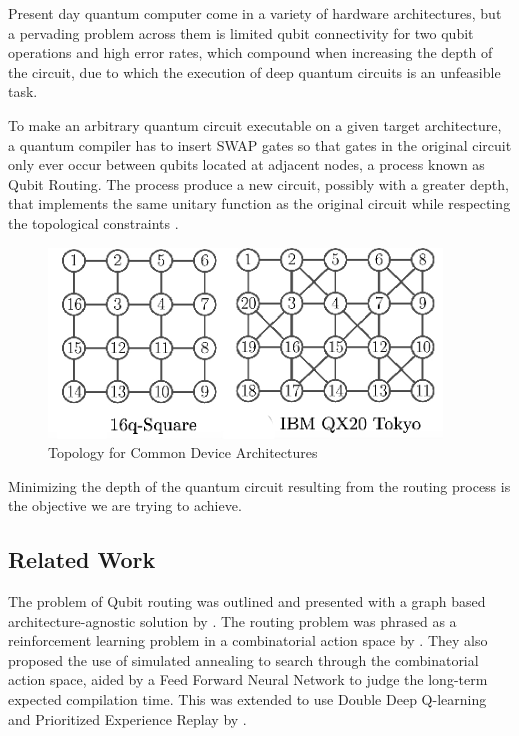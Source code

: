 \documentclass[%
 reprint,
 amsmath,amssymb,
 aps,
]{revtex4-2}
\begin{document}
Present day quantum computer come in a variety of hardware architectures, but a pervading problem across them is limited qubit connectivity for two qubit operations and high error rates, which compound when increasing the depth of the circuit, due to which the execution of deep quantum circuits is an unfeasible task.

To make an arbitrary quantum circuit executable on a given target architecture, a quantum compiler has to insert SWAP gates so that gates in the original circuit only ever occur between qubits located at adjacent nodes, a process known as Qubit Routing. The process produce a new circuit, possibly with a greater depth, that implements the same unitary function as the original circuit while respecting
the topological constraints \citep{qroute_dqn2}.

\begin{figure}
    \centering
    \includegraphics[width=\linewidth]{images/topology-graph.png}
    \caption{Topology for Common Device Architectures \citep{photo_architecture_graph}}
    \label{fig:topology-example}
\end{figure}

Minimizing the depth of the quantum circuit resulting from the routing process is the objective we are trying to achieve.


\subsection{\label{sec:intro-related}Related Work}

The problem of Qubit routing was outlined and presented with a graph based architecture-agnostic solution by \citet{qroute_tket}. The routing problem was phrased as a reinforcement learning problem in a combinatorial action space by \citet{qroute_dqn1}. They also proposed the use of simulated annealing to search through the combinatorial action space, aided by a Feed Forward Neural Network to judge the long-term expected compilation time. This was extended to use Double Deep Q-learning and Prioritized Experience Replay by \citet{qroute_dqn2}.
\end{document}

